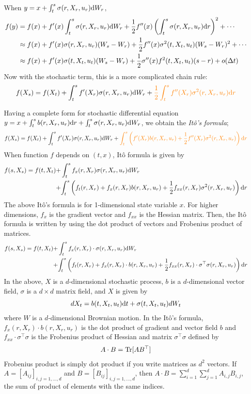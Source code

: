 \documentclass[11pt]{book}
\newcommand{\dt}{\text{\normalfont d}t}
\newcommand{\dr}{\text{\normalfont d}r}
\newcommand{\dW}{\text{\normalfont d}W}
\begin{document}
When $y=x+\int_t^s \sigma(r,X_r,u_r)\dW_r$, 
\[
\begin{split}
f(y)& = f(x) + f^{\prime}(x)\int_t^s \sigma(r,X_r,u_r)\dW_r + \frac12f^{\prime\prime}(x) \left(\int_t^s \sigma(r,X_r,u_r)\dr\right)^2 + \cdots\\
& \approx f(x) + f^{\prime}(x) \sigma(r,X_r,u_r)(W_s-W_r) + \frac12f^{\prime\prime}(x) \sigma^2(t,X_t,u_t)(W_s-W_r)^2 + \cdots\\
& \approx f(x) + f^{\prime}(x) \sigma(t,X_t,u_t)(W_s-W_r) + \frac12\sigma^{\prime\prime}(x) f^2(t,X_t,u_t)(s-r)+o(\Delta t)
\end{split}
\]
Now with the stochastic term, this is a more complicated chain rule:
\[
f(X_s)=f(X_t)+\int_t^s f^\prime(X_r)\sigma(r,X_r,u_r)\dW_r + {\color{orange}\frac12\int_t^s f^{\prime\prime}(X_r)\sigma^2(r,X_r,u_r)\dr}
\]

Having a complete form for stochastic differential equation $y=x+\int_t^s b(r,X_r,u_r)\dr+\int_t^s \sigma(r,X_r,u_r)\dW_r$, we obtain the \emph{Itô's formula};
\[
f(X_s)=f(X_t)+\int_t^s f^\prime(X_r)\sigma(r,X_r,u_r)\dW_r + {\color{orange}\int_t^s \left(f^\prime(X_r)b(r,X_r,u_r)+\frac12f^{\prime\prime}(X_r)\sigma^2(r,X_r,u_r)\right)\dr}
\]
When function $f$ depends on $(t,x)$, 
Itô formula is given by
\[
\begin{split}
    f(s,X_s)=f(t,X_t)+&\int_t^s f_x(r,X_r)\sigma(r,X_r,u_r)\dW_r\\
    +& {\int_t^s \left(f_t(r,X_r)+f_x(r,X_r)b(r,X_r,u_r)+\frac12f_{xx}(r,X_r)\sigma^2(r,X_r,u_r)\right)\dr}
\end{split}
\]
The above Itô's formula is for 1-dimensional state variable $x$. For higher dimensions, $f_x$ is the gradient vector and $f_{xx}$ is the Hessian matrix. Then, the Itô formula is written by using the dot product of vectors and Frobenius product of matrices.
\[
\begin{split}
    f(s,X_s)=f(t,X_t)+&\int_t^s f_x(r,X_r)\cdot \sigma(r,X_r,u_r)\dW_r\\
    +& {\int_t^s \left(f_t(r,X_r)+f_x(r,X_r)\cdot b(r,X_r,u_r)+\frac12f_{xx}(r,X_r)\cdot\sigma^{\top}\sigma(r,X_r,u_r)\right)\dr}
\end{split}
\]
In the above, $X$ is a $d$-dimensional stochastic process, $b$ is a $d$-dimensional vector field, $\sigma$ is a $d\times d$ matrix field, and $X$ is given by
\[
dX_t = b(t,X_t,u_t)\dt +\sigma(t,X_t,u_t)dW_t
\]
where $W$ is a $d$-dimensional Brownian motion. 
In the Itô's formula, $f_x(r,X_r)\cdot b(r,X_r,u_r)$ is the dot product of gradient and vector field $b$ and $f_{xx}\cdot\sigma^{\top}\sigma$ is the Frobenius product of Hessian  and matrix $\sigma^{\top}\sigma$ defined by 
\[
A\cdot B = \text{\normalfont Tr}[AB^\top]
\]
Frobenius product is simply dot product if you write matrices as $d^2$ vectors. If $A=[A_{ij}]_{i,j=1,...,d}$ and $B=[B_{ij}]_{i,j=1,...,d}$, then 
$A\cdot B = \sum_{i=1}^d\sum_{j=1}^d A_{i,j}B_{i,j}$, the sum of product of elements with the same indices.
\end{document}
